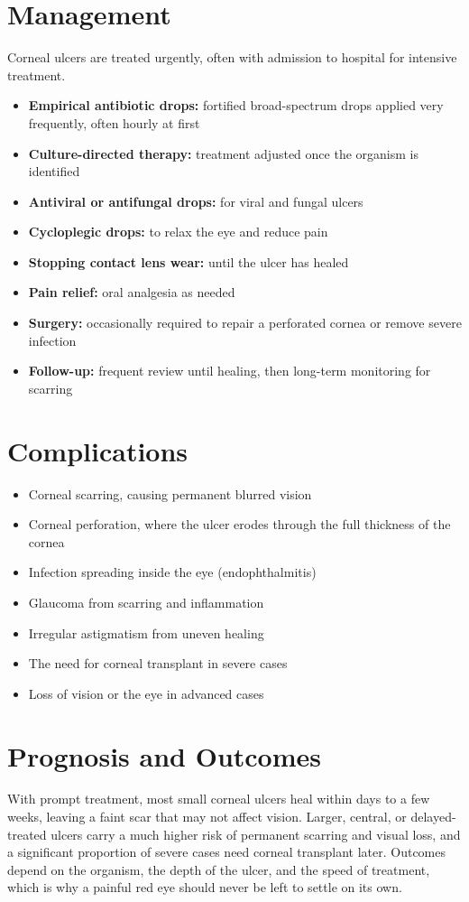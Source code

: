 \section*{Management}
Corneal ulcers are treated urgently, often with admission to hospital for intensive treatment.

\begin{itemize}
    \item \textbf{Empirical antibiotic drops:} fortified broad-spectrum drops applied very frequently, often hourly at first
    \item \textbf{Culture-directed therapy:} treatment adjusted once the organism is identified
    \item \textbf{Antiviral or antifungal drops:} for viral and fungal ulcers
    \item \textbf{Cycloplegic drops:} to relax the eye and reduce pain
    \item \textbf{Stopping contact lens wear:} until the ulcer has healed
    \item \textbf{Pain relief:} oral analgesia as needed
    \item \textbf{Surgery:} occasionally required to repair a perforated cornea or remove severe infection
    \item \textbf{Follow-up:} frequent review until healing, then long-term monitoring for scarring
\end{itemize}

\section*{Complications}
\begin{itemize}
    \item Corneal scarring, causing permanent blurred vision
    \item Corneal perforation, where the ulcer erodes through the full thickness of the cornea
    \item Infection spreading inside the eye (endophthalmitis)
    \item Glaucoma from scarring and inflammation
    \item Irregular astigmatism from uneven healing
    \item The need for corneal transplant in severe cases
    \item Loss of vision or the eye in advanced cases
\end{itemize}

\section*{Prognosis and Outcomes}
With prompt treatment, most small corneal ulcers heal within days to a few weeks, leaving a faint scar that may not affect vision. Larger, central, or delayed-treated ulcers carry a much higher risk of permanent scarring and visual loss, and a significant proportion of severe cases need corneal transplant later. Outcomes depend on the organism, the depth of the ulcer, and the speed of treatment, which is why a painful red eye should never be left to settle on its own.

